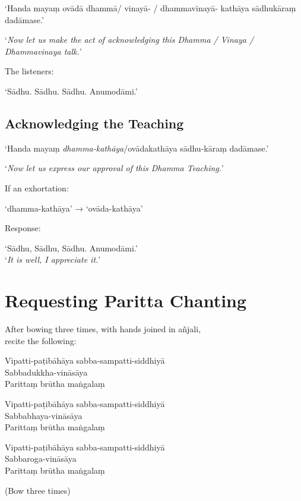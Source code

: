 ‘Handa mayaṃ ovādā dhammā/ vinayā- / dhammavinayā- kathāya sādhukāraṃ dadāmase.’

‘\emph{Now let us make the act of acknowledging this Dhamma / Vinaya / Dhammavinaya talk.}’

\ifhandbookedition
\enlargethispage{\baselineskip}
\fi

The listeners:

‘Sādhu. Sādhu. Sādhu. Anumodāmi.’

\subsection{Acknowledging the Teaching}

‘Handa mayaṃ \emph{dhamma-kathāya}/ovādakathāya sādhu-kāraṃ dadāmase.’

‘\emph{Now let us express our approval of this Dhamma Teaching.}’

If an exhortation:

‘dhamma-kathāya’ → ‘ovāda-kathāya’

Response:

‘Sādhu, Sādhu, Sādhu. Anumodāmi.’\\
‘\emph{It is well, I appreciate it.}’

\ifhandbookedition
\clearpage
\fi

\section{Requesting Paritta Chanting}

\begin{instruction}
  After bowing three times, with hands joined in añjali,\\
  recite the following:
\end{instruction}

Vipatti-paṭibāhāya sabba-sampatti-siddhiyā\\
Sabbadukkha-vināsāya\\
Parittaṃ brūtha maṅgalaṃ

Vipatti-paṭibāhāya sabba-sampatti-siddhiyā\\
Sabbabhaya-vināsāya\\
Parittaṃ brūtha maṅgalaṃ

Vipatti-paṭibāhāya sabba-sampatti-siddhiyā\\
Sabbaroga-vināsāya\\
Parittaṃ brūtha maṅgalaṃ

\begin{instruction}
  (Bow three times)
\end{instruction}

